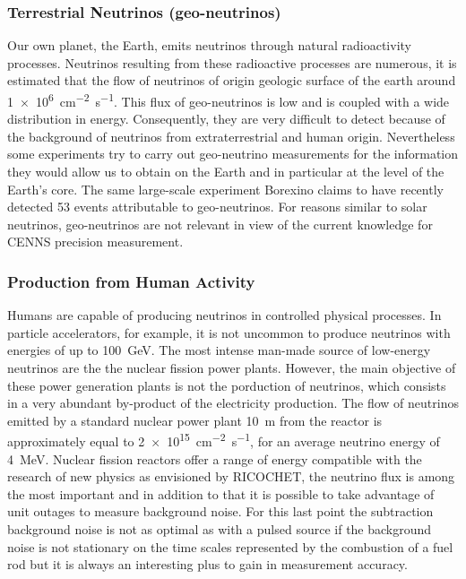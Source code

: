 \subsubsection{Terrestrial Neutrinos (geo-neutrinos)}

Our own planet, the Earth, emits neutrinos through natural radioactivity processes. Neutrinos resulting from these radioactive processes are numerous, it is estimated that the flow of neutrinos of origin geologic surface of the earth around \SI{1e6}{\cm^{-2} \s^{-1}}.
This flux of geo-neutrinos is low and is coupled with a wide distribution in energy. Consequently, they are very difficult to detect because of the background of neutrinos from extraterrestrial and human origin. Nevertheless some experiments try to carry out geo-neutrino measurements for the information they would allow us to obtain on the Earth and in particular at the level of the Earth's core. The same large-scale experiment Borexino claims to have recently detected 53 events attributable to geo-neutrinos.
For reasons similar to solar neutrinos, geo-neutrinos are not relevant in view of the current knowledge for CENNS precision measurement.

\subsubsection{Production from Human Activity}

Humans are capable of producing neutrinos in controlled physical processes. In particle accelerators, for example, it is not uncommon to produce neutrinos with energies of up to \SI{100}{\giga\eV}. The most intense man-made source of low-energy neutrinos are the the nuclear fission power plants. However, the main objective of these power generation plants is not the porduction of neutrinos, which consists in a very abundant by-product of the electricity production. The flow of neutrinos emitted by a standard nuclear power plant \SI{10}{\m} from the reactor is approximately equal to \SI{2e15}{\cm^{-2} \s^{-1}}, for an average neutrino energy of \SI{4}{\mega\eV}. Nuclear fission reactors offer a range of energy compatible with the research of new physics as envisioned by RICOCHET, the neutrino flux is among the most important and in addition to that it is possible to take advantage of unit outages to measure background noise. For this last point the subtraction background noise is not as optimal as with a pulsed source if the background noise is not stationary on the time scales represented by the combustion of a fuel rod but it is always an interesting plus to gain in measurement accuracy.


